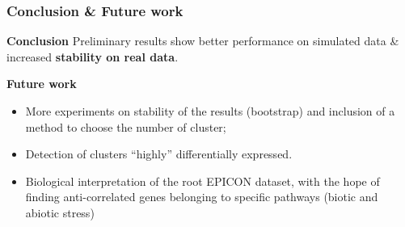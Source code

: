 \documentclass[xcolor=dvipsnames]{beamer}
\begin{document}
\begin{frame}
\frametitle{Conclusion \& Future work}

\textbf{\color{Blue} Conclusion} Preliminary results show better performance
on simulated data \& increased \textbf{stability
on real data}.

\vspace{2em}
\textbf{\color{Blue} Future work}
\begin{itemize}[label={$\bullet$}]
\item More experiments on stability of the results (bootstrap) and inclusion
of a method to choose the number of cluster;
\item Detection of clusters ``highly'' differentially expressed.
\item Biological interpretation of the root EPICON dataset, with the hope of
finding anti-correlated genes belonging to specific pathways (biotic and
abiotic stress)
\end{itemize}

\end{frame}
\end{document}
